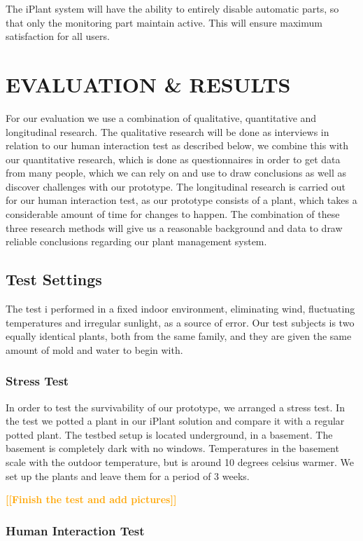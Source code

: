 \documentclass{ubicomp2012}
\newcommand{\todo}[1]{\textsf{\textbf{\textcolor{Orange}{[[#1]]}}}}
\begin{document}
The iPlant system will have the ability to entirely disable automatic parts, so that only the monitoring part maintain active. This will ensure maximum satisfaction for all users.

\section{EVALUATION \& RESULTS}
For our evaluation we use a combination of qualitative, quantitative and longitudinal \cite{longitudinal} research.
The qualitative research will be done as interviews in relation to our human interaction test as described below, we combine this with our quantitative research, which is done as questionnaires in order to get data from many people, which we can rely on and use to draw conclusions as well as discover challenges with our prototype. The longitudinal research is carried out for our human interaction test, as our prototype consists of a plant, which takes a considerable amount of time for changes to happen. The combination of these three research methods will give us a reasonable background and data to draw reliable conclusions regarding our plant management system.

\subsection{Test Settings}
The test i performed in a fixed indoor environment, eliminating wind, fluctuating temperatures and irregular sunlight, as a source of error. 
Our test subjects is two equally identical plants, both from the same family, and they are given the same amount of mold and water to begin with.

\subsubsection{Stress Test}
In order to test the survivability of our prototype, we arranged a stress test. In the test we potted a plant in our iPlant solution and compare it with a regular potted plant. 
The testbed setup is located underground, in a basement. The basement is completely dark with no windows. Temperatures in the basement scale with the outdoor temperature, but is around 10 degrees celsius warmer. We set up the plants and leave them for a period of 3 weeks.

\todo{Finish the test and add pictures}

\subsubsection{Human Interaction Test}
\end{document}

